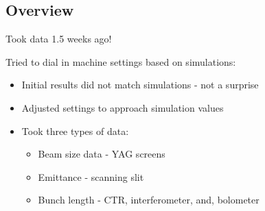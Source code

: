 \documentclass[professionalfonts,t]{beamer}
\begin{document}
\subsection{Overview}
\begin{frame}
Took data 1.5 weeks ago!

Tried to dial in machine settings based on simulations:
\begin{itemize}
	\item Initial results did not match simulations - not a surprise
	\item Adjusted settings to approach simulation values
	\item Took three types of data:
	\begin{itemize}
		\item Beam size data - YAG screens
		\item Emittance - scanning slit
		\item Bunch length - CTR, interferometer, and, bolometer 
	\end{itemize}
\end{itemize}

\end{frame}
\end{document}
